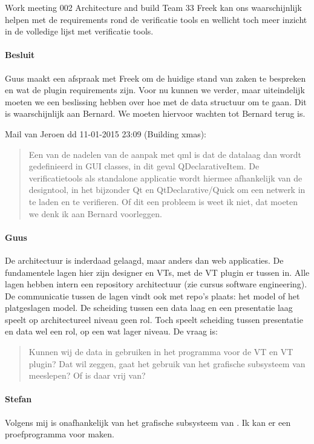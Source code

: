 \documentclass[a4paper,final]{article}
\begin{document}
\begin{Minutes}{Work meeting 002 Architecture and build Team 33}
Freek kan ons waarschijnlijk helpen met de requirements rond de verificatie tools
en wellicht toch meer inzicht in de volledige lijst met verificatie tools.

\paragraph{Besluit} Guus maakt een afspraak met Freek om de huidige stand
van zaken te bespreken en wat de plugin requirements zijn.
Voor nu kunnen we verder, maar uiteindelijk moeten we een beslissing
hebben over hoe met de data structuur om te gaan. Dit is waarschijnlijk
aan Bernard. We moeten hiervoor wachten tot Bernard terug is.


Mail van Jeroen dd 11-01-2015 23:09 (Building xmas):

\begin{quote} Een van de nadelen van de aanpak met qml is dat de datalaag dan
	wordt gedefinieerd in GUI classes, in dit geval QDeclarativeItem. De
	verificatietools als standalone applicatie wordt hiermee afhankelijk van de
	designtool, in het bijzonder Qt en QtDeclarative/Quick om een netwerk in te
	laden en te verifieren. Of dit een probleem is weet ik niet, dat moeten we
	denk ik aan Bernard voorleggen.
\end{quote}

\paragraph{Guus} De architectuur is inderdaad gelaagd, maar anders dan web
applicaties.  De fundamentele lagen hier zijn designer en VTs, met de VT plugin
er tussen in.  Alle lagen hebben intern een repository architectuur (zie cursus
software engineering).  
De communicatie tussen de lagen vindt ook met repo's plaats: het model of het 
platgeslagen model. De scheiding tussen een data laag en een presentatie
laag speelt op architectureel niveau geen rol. Toch speelt scheiding tussen
presentatie en data wel een rol, op een wat lager niveau. De vraag is:

\begin{quote}
	Kunnen wij de data in \qml gebruiken in het programma voor de VT en VT plugin?
	Dat wil zeggen, gaat het gebruik van \qml het grafische subsysteem van \qt 
	meeslepen? Of is \qml daar vrij van?
\end{quote}

\paragraph{Stefan} Volgens mij is \qml onafhankelijk van het grafische
subsysteem van \qt. Ik kan er een proefprogramma voor maken.


\end{Minutes}
\end{document}
